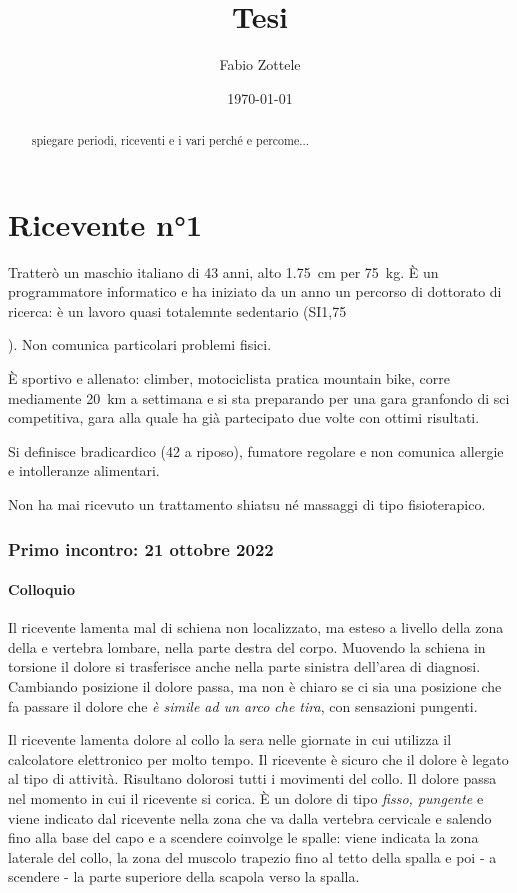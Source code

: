 \documentclass[12pt, openright, twoside]{report}
\newcommand{\RNum}[1]{\uppercase\expandafter{\romannumeral #1\relax}}
\begin{document}
\title{Tesi}
\author{Fabio Zottele}
\date{\today}
\maketitle
\begin{abstract}
spiegare periodi, riceventi e i vari perché e percome...
\end{abstract}
\chapter*{Ricevente n°1}
Tratterò un maschio italiano di 43 anni, alto \SI{1,75}{\centi\metre}
per \SI{75}{\kilogram}. \`{E} un programmatore informatico e ha iniziato da un
anno un percorso di dottorato di ricerca: è un lavoro quasi totalemnte sedentario (SI{1,75}{\hours\per\week).
Non comunica particolari problemi fisici.

\`{E} sportivo e allenato: climber, motociclista pratica mountain bike, corre
mediamente \SI{20}{\kilo\metre} a settimana e si sta preparando per una gara
granfondo di sci competitiva, gara alla quale ha già partecipato due volte con
ottimi risultati.

Si definisce bradicardico (\SI{42}{\bpm} a riposo), fumatore regolare
e non comunica allergie e intolleranze alimentari.

Non ha mai ricevuto un trattamento shiatsu né massaggi di tipo fisioterapico.
\subsection*{Primo incontro: 21 ottobre 2022}
\subsubsection{Colloquio}
Il ricevente lamenta mal di schiena non localizzato, ma esteso a livello della
zona della \RNum{1} e \RNum{2} vertebra lombare, nella parte destra del corpo.
Muovendo la schiena in torsione il dolore si trasferisce anche nella parte
sinistra dell'area di diagnosi.
Cambiando posizione il dolore passa, ma non è chiaro se ci sia una posizione che
fa passare il dolore che \textit{è simile ad un arco che tira}, con sensazioni
pungenti.

Il ricevente lamenta dolore al collo la sera nelle giornate in cui utilizza il
calcolatore elettronico per molto tempo.
Il ricevente è sicuro che il dolore è legato al tipo di attività.
Risultano dolorosi tutti i movimenti del collo.
Il dolore passa nel momento in cui il ricevente si corica.
\`{E} un dolore di tipo \textit{fisso, pungente} e viene indicato dal ricevente
nella zona che va dalla \RNum{7} vertebra cervicale e salendo fino alla base del
capo e a scendere coinvolge le spalle: viene indicata la zona laterale del
collo, la zona del muscolo trapezio fino al tetto della spalla e poi - a
scendere - la parte superiore della scapola verso la spalla.

}
\end{document}
